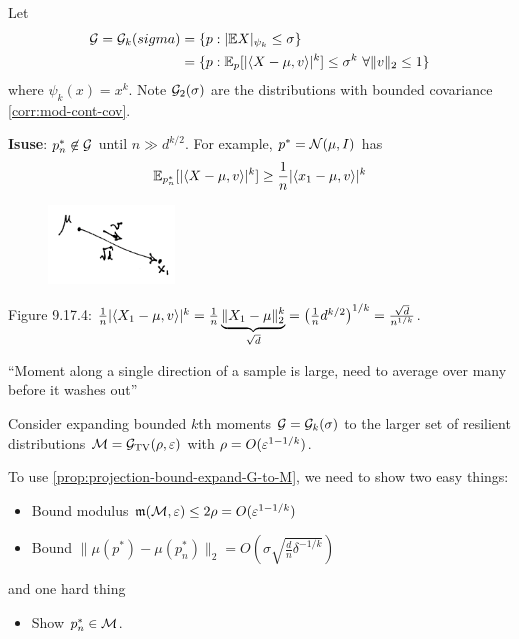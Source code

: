 \begin{example}
  Let
  \begin{align}
    \mathcal{G} = \mathcal{G}_k(sigma)
    &= \{ p : \lvert \mathbb{E} X \rvert_{\psi_k} \leq \sigma \} \\
    &= \{ p : \mathbb{E}_p[ \lvert \braket{X - \mu, v} \rvert^k] \leq \sigma^k~\forall \|v\|_2 \leq 1\}
  \end{align}
  where $\psi_k(x) = x^k$. Note $\mathcal{G}_2(\sigma)$ are the distributions with
  bounded covariance \cref{corr:mod-cont-cov}.

  \textbf{Isuse}: $p_n^* \not\in \mathcal{G}$ until $n \gg d^{k/2}$. For example,
  $p^* = \mathcal{N}(\mu, I)$ has
  \begin{align}
    \mathbb{E}_{p_n^*}[\lvert \braket{X - \mu, v}\rvert^k]
    \geq \frac{1}{n} \lvert \braket{x_1 - \mu, v}\rvert^k
  \end{align}


  \begin{figure}[H]
    \begin{center}
      \includegraphics[width=0.3\textwidth]{figures/9-17-4.png}
    \end{center}
  \end{figure}
  Figure 9.17.4: $\frac{1}{n} \lvert \braket{X_1 - \mu, v}\rvert^k = \frac{1}{n} \underbrace{\|X_1 - \mu\|_2^k}_{\sqrt{d}} = \left( \frac{1}{n} d^{k/2} \right)^{1/k} = \frac{\sqrt{d}}{n^{1/k}}$.

  ``Moment along a single direction of a sample is large, need to average over
  many before it washes out''
\end{example}

Consider expanding bounded $k$th moments $\mathcal{G} = \mathcal{G}_k(\sigma)$ to the larger
set of resilient distributions $\mathcal{M} = \mathcal{G}_{\operatorname{TV}}(\rho, \varepsilon)$ with $\rho = O(\varepsilon^{1 - 1/k})$.

To use \cref{prop:projection-bound-expand-G-to-M}, we need to show two easy
things:
\begin{itemize}
  \item Bound modulus $\mathfrak{m}(\mathcal{M}, \varepsilon) \leq 2 \rho = O(\varepsilon^{1 - 1/k})$
  \item Bound $\|\mu(p^*) - \mu(p_n^*)\|_2 = O\left(\sigma \sqrt{\frac{d}{n} \delta^{-1/k}}\right)$
\end{itemize}
and one hard thing
\begin{itemize}
  \item Show $p^*_n \in \mathcal{M}$.
\end{itemize}

